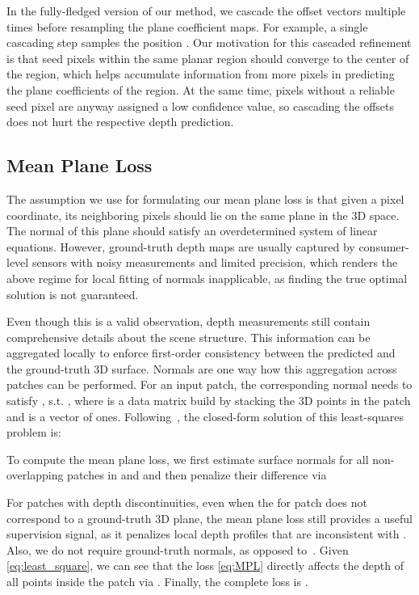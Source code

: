 \documentclass[final]{cvpr}
\begin{document}
In the fully-fledged version of our method, we cascade the offset vectors multiple times before resampling the plane coefficient maps. For example, a single cascading step samples the position . Our motivation for this cascaded refinement is that seed pixels within the same planar region should converge to the center of the region, which helps accumulate information from more pixels in predicting the plane coefficients of the region. At the same time, pixels without a reliable seed pixel are anyway assigned a low confidence value, so cascading the offsets does not hurt the respective depth prediction.

\subsection{Mean Plane Loss}
\label{sec:method:mean:planes}

The assumption we use for formulating our mean plane loss is that given a pixel coordinate, its neighboring pixels should lie on the same plane in the 3D space. The normal  of this plane should satisfy an overdetermined system of linear equations. However, ground-truth depth maps are usually captured by consumer-level sensors with noisy measurements and limited precision, which renders the above regime for local fitting of normals inapplicable, as finding the true optimal solution is not guaranteed.

Even though this is a valid observation, depth measurements still contain comprehensive details about the scene structure. This information can be aggregated locally to enforce first-order consistency between the predicted and the ground-truth 3D surface. Normals are one way how this aggregation across patches can be performed. For an input patch, the corresponding normal  needs to satisfy , s.t. , where  is a data matrix build by stacking the 3D points in the patch and  is a vector of ones. Following~\cite{data-driven:3D:ICCV:2013, geonet:depth:normal}, the closed-form solution of this least-squares problem is:
\vspace{-0.3cm}

To compute the mean plane loss, we first estimate surface normals for all  non-overlapping patches in  and  and then penalize their difference via
\vspace{-0.3cm}


For patches with depth discontinuities, even when the  for patch   does not correspond to a ground-truth 3D plane, the mean plane loss still provides a useful supervision signal, as it penalizes local depth profiles that are inconsistent with . Also, we do not require ground-truth normals, as opposed to~\cite{geonet:depth:normal}. Given \eqref{eq:least_square}, we can see that the loss \eqref{eq:MPL} directly affects the depth of all points inside the patch via . Finally, the complete loss is .
\end{document}
